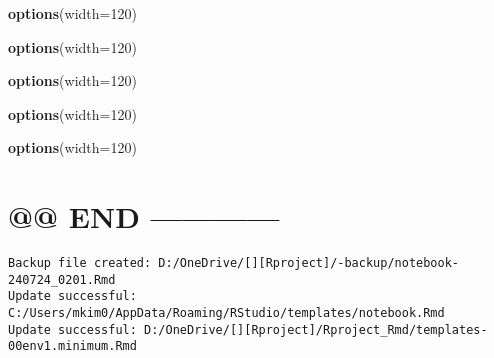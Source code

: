 \documentclass[
]{article}
\newenvironment{Shaded}{\begin{snugshade}}{\end{snugshade}}
\newcommand{\AttributeTok}[1]{\textcolor[rgb]{0.13,0.29,0.53}{#1}}
\newcommand{\DecValTok}[1]{\textcolor[rgb]{0.00,0.00,0.81}{#1}}
\newcommand{\FunctionTok}[1]{\textcolor[rgb]{0.13,0.29,0.53}{\textbf{#1}}}
\newcommand{\NormalTok}[1]{#1}
\begin{document}
\begin{Shaded}
\begin{Highlighting}[]
\FunctionTok{options}\NormalTok{(}\AttributeTok{width=}\DecValTok{120}\NormalTok{)}
\end{Highlighting}
\end{Shaded}

\begin{Shaded}
\begin{Highlighting}[]
\FunctionTok{options}\NormalTok{(}\AttributeTok{width=}\DecValTok{120}\NormalTok{)}
\end{Highlighting}
\end{Shaded}

\begin{Shaded}
\begin{Highlighting}[]
\FunctionTok{options}\NormalTok{(}\AttributeTok{width=}\DecValTok{120}\NormalTok{)}
\end{Highlighting}
\end{Shaded}

\begin{Shaded}
\begin{Highlighting}[]
\FunctionTok{options}\NormalTok{(}\AttributeTok{width=}\DecValTok{120}\NormalTok{)}
\end{Highlighting}
\end{Shaded}

\begin{Shaded}
\begin{Highlighting}[]
\FunctionTok{options}\NormalTok{(}\AttributeTok{width=}\DecValTok{120}\NormalTok{)}
\end{Highlighting}
\end{Shaded}

\hypertarget{end}{%
\section{@@ END ------------}\label{end}}

\begin{verbatim}
Backup file created: D:/OneDrive/[][Rproject]/-backup/notebook-240724_0201.Rmd
Update successful: C:/Users/mkim0/AppData/Roaming/RStudio/templates/notebook.Rmd
Update successful: D:/OneDrive/[][Rproject]/Rproject_Rmd/templates-00env1.minimum.Rmd
\end{verbatim}
\end{document}
